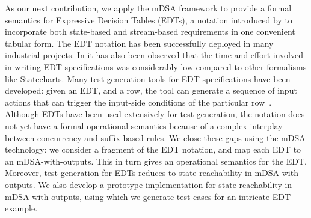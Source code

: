   As our next contribution, we apply the mDSA framework to provide a formal semantics for Expressive Decision Tables (EDTs), a notation introduced by \cite{DBLP:conf/date/VenkateshSKA14} to incorporate both state-based and stream-based requirements in one convenient tabular form. The EDT notation has been successfully deployed in many industrial projects. In \cite{DBLP:conf/date/VenkateshSKA14} it has also been observed that the time and effort involved in writing EDT specifications was considerably low compared to other formalisms like  Statecharts. Many test generation tools for EDT specifications have been developed: given an EDT, and a row, the tool can generate a sequence of input actions that can trigger the input-side conditions of the particular row~\cite{DBLP:conf/enase/VenkateshSZA15a,DBLP:conf/icst/AgrawalVSZV20}. %
  Although EDTs have been used extensively for test generation, the notation does not yet have a formal operational semantics because of a complex interplay between concurrency and suffix-based rules. We close these gaps using the mDSA technology: we consider a fragment of the EDT notation, and map each EDT to an mDSA-with-outputs. This in turn gives an operational semantics for the EDT. Moreover, test generation for EDTs reduces to state reachability in mDSA-with-outputs. We also develop a prototype implementation for state reachability in mDSA-with-outputs, using which we generate test cases for an intricate EDT example. 
  
  
  
  

  

  
  




